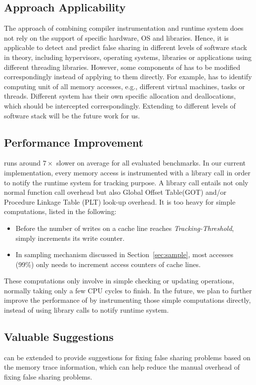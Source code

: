 \subsection{Approach Applicability}
The approach of combining compiler instrumentation and runtime system does not rely on the support of specific hardware, OS and libraries.
Hence, it is applicable to detect and predict false sharing in different levels of 
software stack in theory, including hypervisors, operating systems, libraries or 
applications using different threading libraries.
However, some components of \Predator{} has to be 
modified correspondingly instead of applying to them directly.
For example, \Predator{} has to identify computing unit of all memory accesses, 
e.g., different virtual machines, tasks or threads. 
Different system has their own specific allocation and deallocations, which should be intercepted correspondingly. Extending \Predator{} to different levels of software stack will be the future work for us.


\subsection{Performance Improvement}
\Predator{} runs around $7\times$ slower on average for all evaluated benchmarks. 
In our current implementation, every memory access is instrumented with a library call 
in order to notify the runtime system for tracking purpose. A library call entails not only normal function call overhead but also Global Offset Table(GOT) and/or Procedure Linkage Table (PLT) look-up overhead. 
It is too heavy for simple computations, listed in the following:

\begin{itemize}
\item
Before the number of writes on a cache line reaches {\it Tracking-Threshold},  \Predator{} simply increments its write counter.

\item
In sampling mechanism discussed in Section~\ref{sec:sample}, 
most accesses (99\%) only needs to increment access counters of cache lines.
\end{itemize}

These computations only involve in simple checking or updating operations,
normally taking only a few CPU cycles to finish. 
In the future, we plan to further improve the performance of \Predator{} 
by instrumenting those simple computations directly, 
instead of using library calls to notify runtime system.

\subsection{Valuable Suggestions}
\Predator{} can be extended to provide suggestions for fixing false sharing problems based on the memory trace information, which can help reduce the manual overhead of fixing false sharing problems.  

